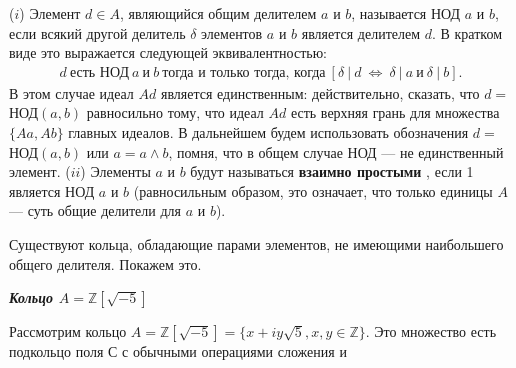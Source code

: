 \begin{determ}
\textit{\indent} ($i$) Элемент $d \in A$, являющийся общим делителем $a$ и $b$, называется НОД $a$ и $b$, если всякий другой делитель $\delta$ элементов $a$ и $b$ является делителем $d$. В кратком виде это выражается следующей эквивалентностью:
\begin{align*}
d\:\text{есть НОД}\:a\:\text{и}\:b\:\text{тогда и только тогда, когда}\:[\delta\:|\:d\:\Longleftrightarrow\:\delta\:|\:a\:\text{и}\:\delta\:|\:b]\text{.}
\end{align*}
В этом случае идеал $Ad$ является единственным: действительно, сказать, что $d = $НОД$(a,b)$ равносильно тому, что идеал $Ad$ есть верхняя грань для множества $\{Aa, Ab\}$ главных идеалов. \newline \indent В дальнейшем будем использовать обозначения $d = $НОД$(a, b)$ или $a = a \wedge b$, помня, что в общем случае НОД — не единственный элемент. \newline \indent ($ii$) Элементы $a$ и $b$ будут называться \textbf{взаимно простыми} , если 1 является НОД $a$ и $b$ (равносильным образом, это означает, что только единицы $A$ — суть общие делители для $a$ и $b$).
\end{determ}

Существуют кольца, обладающие парами элементов, не имеющими наибольшего общего делителя. Покажем это.

\textit{\textbf{Кольцо $A = \mathds{Z}[\sqrt{-5}]$}}

Рассмотрим кольцо $A = \mathds{Z}[\sqrt{-5}] = \{x + iy\sqrt{5}, x, y \in \mathds{Z}\}$. Это множество есть подкольцо поля С с обычными операциями сложения и

